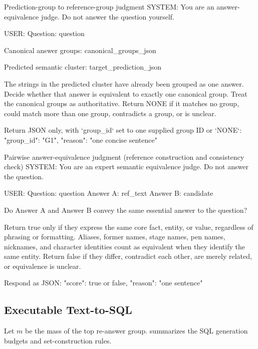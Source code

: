 \begin{promptbox}{Prediction-group to reference-group judgment}
SYSTEM:
You are an answer-equivalence judge. Do not answer the question yourself.

USER:
Question:
{question}

Canonical answer groups:
{canonical_groups_json}

Predicted semantic cluster:
{target_prediction_json}

The strings in the predicted cluster have already been grouped as one answer.
Decide whether that answer is equivalent to exactly one canonical group.
Treat the canonical groups as authoritative. Return NONE if it matches no group,
could match more than one group, contradicts a group, or is unclear.

Return JSON only, with `group_id` set to one supplied group ID or `NONE`:
{"group_id": "G1", "reason": "one concise sentence"}
\end{promptbox}

\begin{promptbox}{Pairwise answer-equivalence judgment (reference construction and \circleclar{} consistency check)}
SYSTEM:
You are an expert semantic equivalence judge. Do not answer the question.

USER:
Question: {question}
Answer A: {ref_text}
Answer B: {candidate}

Do Answer A and Answer B convey the same essential answer to the question?

Return true only if they express the same core fact, entity, or value, regardless of phrasing or formatting.
Aliases, former names, stage names, pen names, nicknames, and character identities count as equivalent when they identify the same entity.
Return false if they differ, contradict each other, are merely related, or equivalence is unclear.

Respond as JSON:
{"score": true or false, "reason": "one sentence"}
\end{promptbox}

\subsection{Executable Text-to-SQL}

 Let $m$ be the mass of the top re-answer group.  summarizes the SQL generation budgets and set-construction rules.

